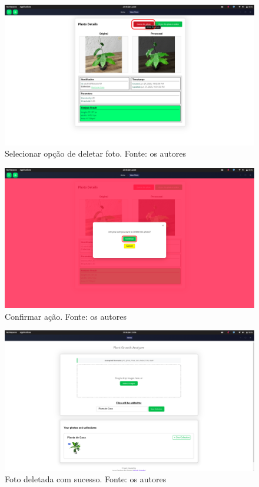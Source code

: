 \begin{figure}[H]
    \centering
    \includegraphics[width=1\textwidth]{../figures/screens/uc005/Screenshot from 2025-06-27 22-06-36.png}
    \caption{Selecionar opção de deletar foto. Fonte: os autores}
    \label{fig:uc005-screen2}
\end{figure}

\begin{figure}[H]
    \centering
    \includegraphics[width=1\textwidth]{../figures/screens/uc005/Screenshot from 2025-06-27 22-06-40.png}
    \caption{Confirmar ação. Fonte: os autores}
    \label{fig:uc005-screen3}
\end{figure}

\begin{figure}[H]
    \centering
    \includegraphics[width=1\textwidth]{../figures/screens/uc005/Screenshot from 2025-06-27 22-06-51.png}
    \caption{Foto deletada com sucesso. Fonte: os autores}
    \label{fig:uc005-screen4}
\end{figure}

